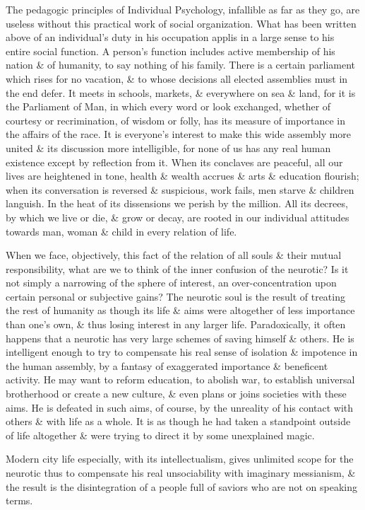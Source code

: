 \documentclass{article}
\numberwithin{equation}{section}
\begin{document}
The pedagogic principles of Individual Psychology, infallible as far as they go, are useless without this practical work of social organization. What has been written above of an individual's duty in his occupation applis in a large sense to his entire social function. A person's function includes active membership of his nation \& of humanity, to say nothing of his family. There is a certain parliament which rises for no vacation, \& to whose decisions all elected assemblies must in the end defer. It meets in schools, markets, \& everywhere on sea \& land, for it is the Parliament of Man, in which every word or look exchanged, whether of courtesy or recrimination, of wisdom or folly, has its measure of importance in the affairs of the race. It is everyone's interest to make this wide assembly more united \& its discussion more intelligible, for none of us has any real human existence except by reflection from it. When its conclaves are peaceful, all our lives are heightened in tone, health \& wealth accrues \& arts \& education flourish; when its conversation is reversed \& suspicious, work fails, men starve \& children languish. In the heat of its dissensions we perish by the million. All its decrees, by which we live or die, \& grow or decay, are rooted in our individual attitudes towards man, woman \& child in every relation of life.

When we face, objectively, this fact of the relation of all souls \& their mutual responsibility, what are we to think of the inner confusion of the neurotic? Is it not simply a narrowing of the sphere of interest, an over-concentration upon certain personal or subjective gains? The neurotic soul is the result of treating the rest of humanity as though its life \& aims were altogether of less importance than one's own, \& thus losing interest in any larger life. Paradoxically, it often happens that a neurotic has very large schemes of saving himself \& others. He is intelligent enough to try to compensate his real sense of isolation \& impotence in the human assembly, by a fantasy of exaggerated importance \& beneficent activity. He may want to reform education, to abolish war, to establish universal brotherhood or create a new culture, \& even plans or joins societies with these aims. He is defeated in such aims, of course, by the unreality of his contact with others \& with life as a whole. It is as though he had taken a standpoint outside of life altogether \& were trying to direct it by some unexplained magic.

Modern city life especially, with its intellectualism, gives unlimited scope for the neurotic thus to compensate his real unsociability with imaginary messianism, \& the result is the disintegration of a people full of saviors who are not on speaking terms.
\end{document}
